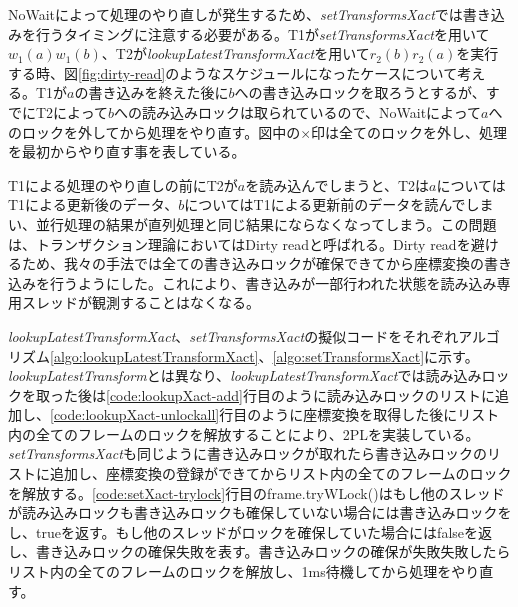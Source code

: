 \documentclass[a4paper]{jreport}	%
\begin{document}
NoWaitによって処理のやり直しが発生するため、\textit{setTransformsXact}では書き込みを行うタイミングに注意する必要がある。T1が\textit{setTransformsXact}を用いて$w_1(a)w_1(b)$、T2が\textit{lookupLatestTransformXact}を用いて$r_2(b)r_2(a)$を実行する時、図\ref{fig:dirty-read}のようなスケジュールになったケースについて考える。T1が$a$の書き込みを終えた後に$b$への書き込みロックを取ろうとするが、すでにT2によって$b$への読み込みロックは取られているので、NoWaitによって$a$へのロックを外してから処理をやり直す。図中の$\times$印は全てのロックを外し、処理を最初からやり直す事を表している。

T1による処理のやり直しの前にT2が$a$を読み込んでしまうと、T2は$a$についてはT1による更新後のデータ、$b$についてはT1による更新前のデータを読んでしまい、並行処理の結果が直列処理と同じ結果にならなくなってしまう。この問題は、トランザクション理論においてはDirty readと呼ばれる。Dirty readを避けるため、我々の手法では全ての書き込みロックが確保できてから座標変換の書き込みを行うようにした。これにより、書き込みが一部行われた状態を読み込み専用スレッドが観測することはなくなる。

\textit{lookupLatestTransformXact}、\textit{setTransformsXact}の擬似コードをそれぞれアルゴリズム\ref{algo:lookupLatestTransformXact}、\ref{algo:setTransformsXact}に示す。\textit{lookupLatestTransform}とは異なり、\textit{lookupLatestTransformXact}では読み込みロックを取った後は\ref{code:lookupXact-add}行目のように読み込みロックのリストに追加し、\ref{code:lookupXact-unlockall}行目のように座標変換を取得した後にリスト内の全てのフレームのロックを解放することにより、2PLを実装している。\textit{setTransformsXact}も同じように書き込みロックが取れたら書き込みロックのリストに追加し、座標変換の登録ができてからリスト内の全てのフレームのロックを解放する。\ref{code:setXact-trylock}行目のframe.tryWLock()はもし他のスレッドが読み込みロックも書き込みロックも確保していない場合には書き込みロックをし、trueを返す。もし他のスレッドがロックを確保していた場合にはfalseを返し、書き込みロックの確保失敗を表す。書き込みロックの確保が失敗失敗したらリスト内の全てのフレームのロックを解放し、1ms待機してから処理をやり直す。
\end{document}
